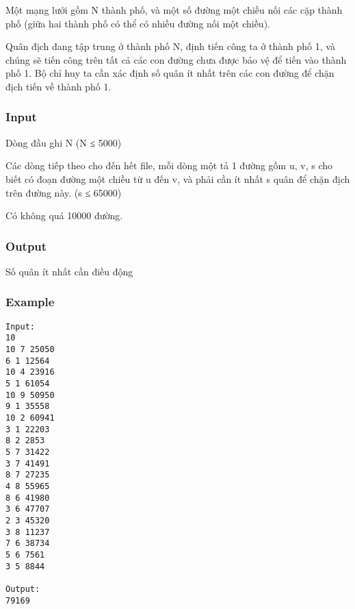 



   Một mạng lưới gồm N thành phố, và một số đường một chiều nối các cặp thành phố (giữa hai thành phố có thể có nhiều đường nối một chiều).   


   Quân địch đang tập trung ở thành phố N, định tiến công ta ở thành phố 1, và chúng sẽ tiến công trên tất cả các con đường chưa được bảo vệ để tiến vào thành phố 1. Bộ chỉ huy ta cần xác định số quân ít nhất trên các con đường để chặn địch tiến về thành phố 1.  

\subsubsection{   Input  }

   Dòng đầu ghi N (N ≤ 5000)   


   Các dòng tiếp theo cho đến hết file, mỗi dòng một tả 1 đường gồm u, v, s cho biết có đoạn đường một chiều từ u đến v, và phải cần ít nhất s quân để chặn địch trên đường này. (s ≤ 65000)   


   Có không quá 10000 đường.  

\subsubsection{   Output  }

   Số quân ít nhất cần điều động  

\subsubsection{   Example  }
\begin{verbatim}
Input:
10
10 7 25050
6 1 12564
10 4 23916
5 1 61054
10 9 50950
9 1 35558
10 2 60941
3 1 22203
8 2 2853
5 7 31422
3 7 41491
8 7 27235
4 8 55965
8 6 41980
3 6 47707
2 3 45320
3 8 11237
7 6 38734
5 6 7561
3 5 8844

Output:
79169

\end{verbatim}
